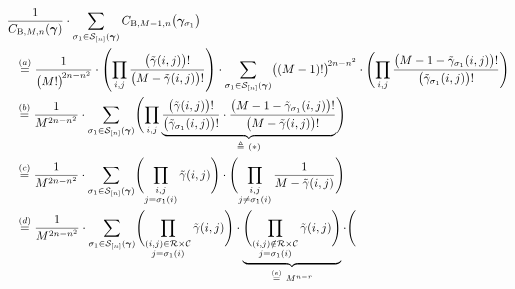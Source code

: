 \documentclass[journal,lettersize,twocolumn]{IEEEtran} %
\newcommand{\vect}[1]{ \bm{#1} }
\newcommand{\set}[1]{\mathcal{#1}}
\newcommand{\vgam}{ \vect{\gamma} }
\newcommand{\defeq}{ \triangleq }
\newcommand{\setC}{\set{C}}
\newcommand{\setR}{\set{R}}
\newcommand{\setS}{\set{S}}
\newcommand{\CBM}[1]{\CBgen{M}{#1}}
\newcommand{\CBgen}[2]{C_{\mathrm{B},#1,#2}}
\newcommand{\tgam}{\tilde{\gamma}}
\newcommand{\bigformulatop}[3]{%
  \begin{figure}[!t]
    \normalsize
    \setcounter{equation}{#1}
    #3

    \setcounter{equation}{#2}
    \hrulefill
    \vspace*{4pt}
  \end{figure}
}
\begin{document}
\begin{appendices}
\bigformulatop{48}{49}{%
\begin{align}
  \hspace{0.25cm}&\hspace{-0.25cm}
  \frac{1}{\CBM{n}(\vgam)}
       \cdot
       \sum_{\sigma_1 \in \setS_{[n]}( \vgam )}
         \CBgen{M-1}{n}
           \bigl( 
             \vgam_{\sigma_1}
           \bigr)
    \nonumber \\
    &\overset{(a)}{=}
      \frac{1}{\bigl( M! \bigr)^{ \! 2n - n^2}}
      \cdot
      \left( 
        \prod_{i,j}
          \frac{ \bigl(\tgam(i,j) \bigr)! }
               { \bigl( M - \tgam(i,j) \bigr)! }
      \right)
      \cdot
      \sum_{\sigma_1 \in \setS_{[n]}( \vgam )}
        \bigl( (M-1)! \bigr)^{ \! 2n -  n^2} 
        \cdot
        \Biggl( 
          \prod_{i,j}
            \frac{ \bigl( M-1- \tgam_{\sigma_1}(i,j) \bigr)!}
                 { \bigl( \tgam_{\sigma_1}(i,j) \bigr)! } 
        \Biggr) \nonumber \\
    &\overset{(b)}{=}
       \frac{1}{M^{ 2n -  n^2}}
       \cdot
       \sum_{\sigma_1 \in \setS_{[n]}( \vgam )}
       \Biggl( 
         \prod_{i,j}
           \underbrace
           {
             \frac{  \bigl(\tgam(i,j) \bigr)! }
                  { \bigl( \tgam_{\sigma_1}(i,j) \bigr)! } 
             \cdot
             \frac{ \bigl( M-1- \tgam_{\sigma_1}(i,j) \bigr)! }
                  { \bigl( M - \tgam(i,j) \bigr)! }
           }_{\defeq \ (*)}
       \Biggr) \nonumber \\
    &\overset{(c)}{=}
       \frac{1}{M^{ 2n -  n^2}}
       \cdot
       \sum_{\sigma_1 \in \setS_{[n]}( \vgam )}
       \Biggl( 
         \prod_{\substack{i,j \\ j = \sigma_1(i)}}
           \tgam(i,j)
       \Biggr)
       \cdot
       \Biggl( 
         \prod_{\substack{i,j \\ j \neq \sigma_1(i)}}
           \frac{ 1 }
                { M - \tgam(i,j) }
       \Biggr) \nonumber \\
    &\overset{(d)}{=}
       \frac{1}{M^{ 2n -  n^2}}
       \cdot
       \sum_{\sigma_1 \in \setS_{[n]}( \vgam )}
       \Biggl( 
         \prod_{\substack{(i,j) \in \setR \times \setC \\ j = \sigma_1(i)}}
           \tgam(i,j)
       \Biggr)
       \cdot
       \underbrace
       {
         \Biggl( 
           \prod_{\substack{(i,j) \notin \setR \times \setC \\ j = \sigma_1(i)}}
             \tgam(i,j)
         \Biggr)
       }_{\overset{(e)}{=} \ M^{n-r}}
       \cdot
       \Biggl( 

\end{align}}
\end{appendices}
\end{document}
